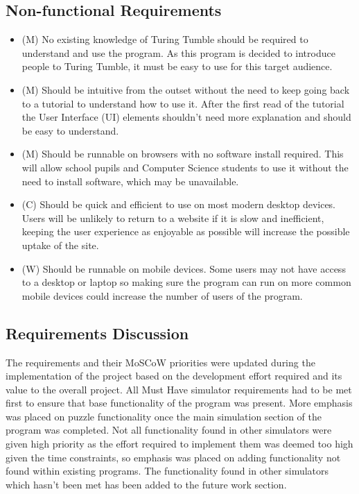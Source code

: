 \documentclass{l4proj}
\begin{document}
\subsection{Non-functional Requirements}
\begin{itemize}
    \item (M) No existing knowledge of Turing Tumble should be required to understand and use the program. As this program is decided to introduce people to Turing Tumble, it must be easy to use for this target audience.
    \item (M) Should be intuitive from the outset without the need to keep going back to a tutorial to understand how to use it. After the first read of the tutorial the User Interface (UI) elements shouldn't need more explanation and should be easy to understand.
    \item (M) Should be runnable on browsers with no software install required. This will allow school pupils and Computer Science students to use it without the need to install software, which may be unavailable.
    \item (C) Should be quick and efficient to use on most modern desktop devices. Users will be unlikely to return to a website if it is slow and inefficient, keeping the user experience as enjoyable as possible will increase the possible uptake of the site.
    \item (W) Should be runnable on mobile devices. Some users may not have access to a desktop or laptop so making sure the program can run on more common mobile devices could increase the number of users of the program.
\end{itemize}

\subsection{Requirements Discussion}
The requirements and their MoSCoW priorities were updated during the implementation of the project based on the development effort required and its value to the overall project. All Must Have simulator requirements had to be met first to ensure that base functionality of the program was present. More emphasis was placed on puzzle functionality once the main simulation section of the program was completed. Not all functionality found in other simulators were given high priority as the effort required to implement them was deemed too high given the time constraints, so emphasis was placed on adding functionality not found within existing programs. The functionality found in other simulators which hasn't been met has been added to the future work section.
\end{document}

